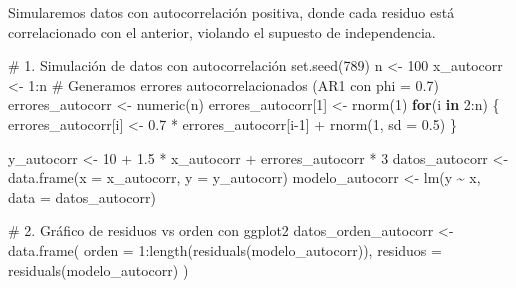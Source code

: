 \documentclass[
  letterpaper,
  DIV=11,
  numbers=noendperiod]{scrreprt}
\newenvironment{Shaded}{\begin{snugshade}}{\end{snugshade}}
\newcommand{\AttributeTok}[1]{\textcolor[rgb]{0.40,0.45,0.13}{#1}}
\newcommand{\CommentTok}[1]{\textcolor[rgb]{0.37,0.37,0.37}{#1}}
\newcommand{\ControlFlowTok}[1]{\textcolor[rgb]{0.00,0.23,0.31}{\textbf{#1}}}
\newcommand{\DecValTok}[1]{\textcolor[rgb]{0.68,0.00,0.00}{#1}}
\newcommand{\FloatTok}[1]{\textcolor[rgb]{0.68,0.00,0.00}{#1}}
\newcommand{\FunctionTok}[1]{\textcolor[rgb]{0.28,0.35,0.67}{#1}}
\newcommand{\NormalTok}[1]{\textcolor[rgb]{0.00,0.23,0.31}{#1}}
\newcommand{\OtherTok}[1]{\textcolor[rgb]{0.00,0.23,0.31}{#1}}
\newcommand{\SpecialCharTok}[1]{\textcolor[rgb]{0.37,0.37,0.37}{#1}}
\begin{document}
\begin{tcolorbox}[enhanced jigsaw, breakable, toprule=.15mm, bottomtitle=1mm, coltitle=black, colbacktitle=quarto-callout-tip-color!10!white, titlerule=0mm, opacitybacktitle=0.6, bottomrule=.15mm, toptitle=1mm, title=\textcolor{quarto-callout-tip-color}{\faLightbulb}\hspace{0.5em}{Contraejemplo: Violación del supuesto de independencia}, arc=.35mm, rightrule=.15mm, opacityback=0, colframe=quarto-callout-tip-color-frame, leftrule=.75mm, left=2mm, colback=white]

Simularemos datos con autocorrelación positiva, donde cada residuo está
correlacionado con el anterior, violando el supuesto de independencia.

\begin{Shaded}
\begin{Highlighting}[]
\CommentTok{\# 1. Simulación de datos con autocorrelación}
\FunctionTok{set.seed}\NormalTok{(}\DecValTok{789}\NormalTok{)}
\NormalTok{n }\OtherTok{\textless{}{-}} \DecValTok{100}
\NormalTok{x\_autocorr }\OtherTok{\textless{}{-}} \DecValTok{1}\SpecialCharTok{:}\NormalTok{n}
\CommentTok{\# Generamos errores autocorrelacionados (AR1 con phi = 0.7)}
\NormalTok{errores\_autocorr }\OtherTok{\textless{}{-}} \FunctionTok{numeric}\NormalTok{(n)}
\NormalTok{errores\_autocorr[}\DecValTok{1}\NormalTok{] }\OtherTok{\textless{}{-}} \FunctionTok{rnorm}\NormalTok{(}\DecValTok{1}\NormalTok{)}
\ControlFlowTok{for}\NormalTok{(i }\ControlFlowTok{in} \DecValTok{2}\SpecialCharTok{:}\NormalTok{n) \{}
\NormalTok{  errores\_autocorr[i] }\OtherTok{\textless{}{-}} \FloatTok{0.7} \SpecialCharTok{*}\NormalTok{ errores\_autocorr[i}\DecValTok{{-}1}\NormalTok{] }\SpecialCharTok{+} \FunctionTok{rnorm}\NormalTok{(}\DecValTok{1}\NormalTok{, }\AttributeTok{sd =} \FloatTok{0.5}\NormalTok{)}
\NormalTok{\}}

\NormalTok{y\_autocorr }\OtherTok{\textless{}{-}} \DecValTok{10} \SpecialCharTok{+} \FloatTok{1.5} \SpecialCharTok{*}\NormalTok{ x\_autocorr }\SpecialCharTok{+}\NormalTok{ errores\_autocorr }\SpecialCharTok{*} \DecValTok{3}
\NormalTok{datos\_autocorr }\OtherTok{\textless{}{-}} \FunctionTok{data.frame}\NormalTok{(}\AttributeTok{x =}\NormalTok{ x\_autocorr, }\AttributeTok{y =}\NormalTok{ y\_autocorr)}
\NormalTok{modelo\_autocorr }\OtherTok{\textless{}{-}} \FunctionTok{lm}\NormalTok{(y }\SpecialCharTok{\textasciitilde{}}\NormalTok{ x, }\AttributeTok{data =}\NormalTok{ datos\_autocorr)}

\CommentTok{\# 2. Gráfico de residuos vs orden con ggplot2}
\NormalTok{datos\_orden\_autocorr }\OtherTok{\textless{}{-}} \FunctionTok{data.frame}\NormalTok{(}
  \AttributeTok{orden =} \DecValTok{1}\SpecialCharTok{:}\FunctionTok{length}\NormalTok{(}\FunctionTok{residuals}\NormalTok{(modelo\_autocorr)),}
  \AttributeTok{residuos =} \FunctionTok{residuals}\NormalTok{(modelo\_autocorr)}
\NormalTok{)}


\end{Highlighting}
\end{Shaded}
\end{tcolorbox}
\end{document}
